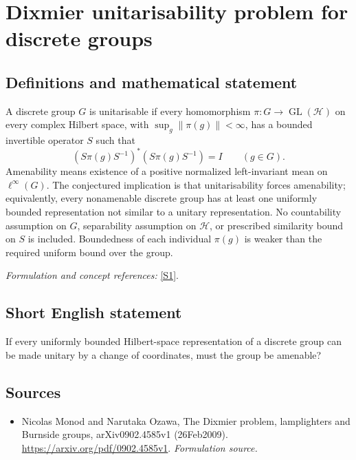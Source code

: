\documentclass[11pt]{article}
\begin{document}
\section*{\texorpdfstring{Dixmier unitarisability problem for discrete groups}{Dixmier unitarisability problem for discrete groups}}\label{376}
\subsection{Definitions and mathematical statement}
A discrete group $G$ is unitarisable if every homomorphism $\pi:G\to\operatorname{GL}(\mathcal H)$ on every complex Hilbert space, with $\sup_g\|\pi(g)\|<\infty$, has a bounded invertible operator $S$ such that
\[
 (S\pi(g)S^{-1})^*(S\pi(g)S^{-1})=I\qquad(g\in G).
\]
Amenability means existence of a positive normalized left-invariant mean on $\ell^\infty(G)$. The conjectured implication is that unitarisability forces amenability; equivalently, every nonamenable discrete group has at least one uniformly bounded representation not similar to a unitary representation. No countability assumption on $G$, separability assumption on $\mathcal H$, or prescribed similarity bound on $S$ is included. Boundedness of each individual $\pi(g)$ is weaker than the required uniform bound over the group.
\par\smallskip\textit{Formulation and concept references:} \href{https://arxiv.org/pdf/0902.4585v1}{[S1]}.

\subsection{Short English statement}
If every uniformly bounded Hilbert-space representation of a discrete group can be made unitary by a change of coordinates, must the group be amenable?
\subsection{Sources}
\begin{itemize}
\item[S1]Nicolas Monod and Narutaka Ozawa, The Dixmier problem, lamplighters and Burnside groups, arXiv0902.4585v1 (26Feb2009).
\url{https://arxiv.org/pdf/0902.4585v1}.
\textit{Formulation source.}
\end{itemize}
\end{document}

